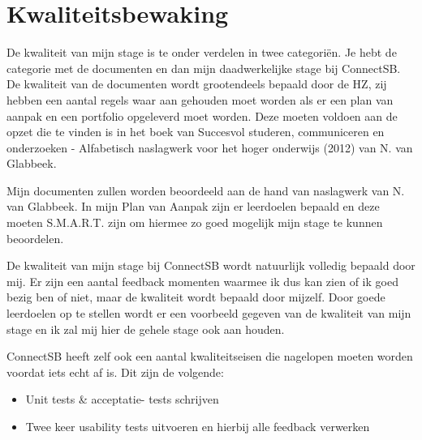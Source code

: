 
\section{Kwaliteitsbewaking}
De kwaliteit van mijn stage is te onder verdelen in twee categoriën. Je hebt de categorie met de documenten en dan mijn daadwerkelijke stage bij ConnectSB. De kwaliteit van de documenten wordt grootendeels bepaald door de HZ, zij hebben een aantal regels waar aan gehouden moet worden als er een plan van aanpak en een portfolio opgeleverd moet worden. Deze moeten voldoen aan de opzet die te vinden is in het boek van Succesvol studeren, communiceren en onderzoeken - Alfabetisch naslagwerk voor het hoger onderwijs (2012) van N. van Glabbeek.

Mijn documenten zullen worden beoordeeld aan de hand van naslagwerk van N. van Glabbeek. In mijn Plan van Aanpak zijn er leerdoelen bepaald en deze moeten S.M.A.R.T. zijn om hiermee zo goed mogelijk mijn stage te kunnen beoordelen.

De kwaliteit van mijn stage bij ConnectSB wordt natuurlijk volledig bepaald door mij. Er zijn een aantal feedback momenten waarmee ik dus kan zien of ik goed bezig ben of niet, maar de kwaliteit wordt bepaald door mijzelf. Door goede leerdoelen op te stellen wordt er een voorbeeld gegeven van de kwaliteit van mijn stage en ik zal mij hier de gehele stage ook aan houden.

ConnectSB heeft zelf ook een aantal kwaliteitseisen die nagelopen moeten worden voordat iets echt af is. Dit zijn de volgende:
\begin{itemize}
\item Unit tests & acceptatie- tests schrijven
\item Twee keer usability tests uitvoeren en hierbij alle feedback verwerken
\end{itemize}

\clearpage

